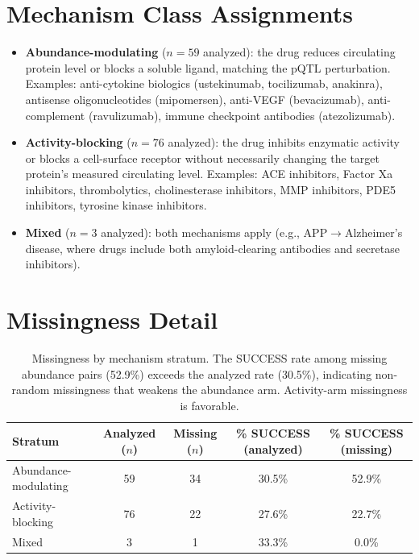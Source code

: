 \documentclass[11pt]{article}
\begin{document}
\section{Mechanism Class Assignments}
\label{app:mechanism}

\begin{itemize}
\item \textbf{Abundance-modulating} ($n = 59$ analyzed): the drug reduces circulating protein level or blocks a soluble ligand, matching the pQTL perturbation. Examples: anti-cytokine biologics (ustekinumab, tocilizumab, anakinra), antisense oligonucleotides (mipomersen), anti-VEGF (bevacizumab), anti-complement (ravulizumab), immune checkpoint antibodies (atezolizumab).
\item \textbf{Activity-blocking} ($n = 76$ analyzed): the drug inhibits enzymatic activity or blocks a cell-surface receptor without necessarily changing the target protein's measured circulating level. Examples: ACE inhibitors, Factor Xa inhibitors, thrombolytics, cholinesterase inhibitors, MMP inhibitors, PDE5 inhibitors, tyrosine kinase inhibitors.
\item \textbf{Mixed} ($n = 3$ analyzed): both mechanisms apply (e.g., APP$\rightarrow$Alzheimer's disease, where drugs include both amyloid-clearing antibodies and secretase inhibitors).
\end{itemize}

\section{Missingness Detail}
\label{app:missingness}

\vspace{1em}
\begin{table}[h]
\centering
\caption{Missingness by mechanism stratum. The SUCCESS rate among missing abundance pairs (52.9\%) exceeds the analyzed rate (30.5\%), indicating non-random missingness that weakens the abundance arm. Activity-arm missingness is favorable.}
\label{tab:miss_mech}
\small
\begin{tabular}{lcccc}
\toprule
Stratum & Analyzed ($n$) & Missing ($n$) & \% SUCCESS (analyzed) & \% SUCCESS (missing) \\
\midrule
Abundance-modulating & 59 & 34 & 30.5\% & 52.9\% \\
Activity-blocking & 76 & 22 & 27.6\% & 22.7\% \\
Mixed & 3 & 1 & 33.3\% & 0.0\% \\
\bottomrule
\end{tabular}
\end{table}
\end{document}
